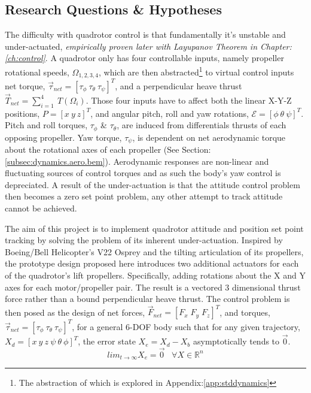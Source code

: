 \subsection{Research Questions \& Hypotheses}
\label{subsec:intro.foreword.hypotheses}
The difficulty with quadrotor control is that fundamentally it's unstable and under-actuated, \emph{empirically proven later with Layupanov Theorem in Chapter:\ref{ch:control}}. A quadrotor only has four controllable inputs, namely propeller rotational speeds, $\Omega_{1,2,3,4}$, which are then abstracted\footnote{The abstraction of which is explored in Appendix:\ref{app:stddynamics}} to virtual control inputs net torque, $\vec{\tau}_{net}=[\tau_{\phi}~\tau_{\theta}~\tau_{\psi}]^T$, and a perpendicular heave thrust $\vec{T}_{net}=\sum_{i=1}^{4}~T(\Omega_i)$. Those four inputs have to affect both the linear X-Y-Z positions, $P=[x~y~z]^T$, and angular pitch, roll and yaw rotations, $\mathcal{E}=[\phi~\theta~\psi]^T$. Pitch and roll torques, $\tau_{\phi}$ \& $\tau_{\theta}$, are induced from differentials thrusts of each opposing propeller. Yaw torque, $\tau_{\psi}$, is dependent on net aerodynamic torque about the rotational axes of each propeller (See Section:\ref{subsec:dynamics.aero.bem}). Aerodynamic responses are non-linear and fluctuating sources of control torques and as such the body's yaw control is depreciated. A result of the under-actuation is that the attitude control problem then becomes a zero set point problem, any other attempt to track attitude cannot be achieved.
\par
The aim of this project is to implement quadrotor attitude and position set point tracking by solving the problem of its inherent under-actuation. Inspired by Boeing/Bell Helicopter's V22 Osprey and the tilting articulation of its propellers, the prototype design proposed here introduces two additional actuators for each of the quadrotor's lift propellers. Specifically, adding rotations about the X and Y axes for each motor/propeller pair. The result is a vectored 3 dimensional thrust force rather than a bound perpendicular heave thrust. The control problem is then posed as the design of net forces, $\vec{F}_{net} = [F_x\;F_y\;F_z]^T$, and torques, $\vec{\tau}_{net} = [\tau_{\phi}~\tau_{\theta}~\tau_{\psi}]^T$, for a general 6-DOF body such that for any given trajectory, $X_d=[x~y~z~\psi~\theta~\phi]^T$, the error state $X_e = X_d - X_b$ asymptotically tends to $\vec{0}$.
\begin{equation} \label{eq:trajectoryerror}
lim_{t \rightarrow \infty} X_e = \vec{0}\hspace{10pt}\forall X \in \mathbb{R}^n
\end{equation}
